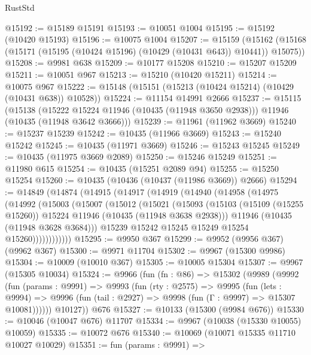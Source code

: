 \begin{lexlean}{RustStd}
\begin{coremodule}
@15192 := @15189 @15191
@15193 := @10051 @1004
@15195 := @15192 (@10420 @15193)
@15196 := @10075 @1004
@15207 := @15159
    (@15162 (@15168 (@15171 (@15195 (@10424 @15196) (@10429 (@10431 @643)) @10441)) @15075))
@15208 := @9981 @638
@15209 := @10177 @15208
@15210 := @15207 @15209
@15211 := @10051 @967
@15213 := @15210 (@10420 @15211)
@15214 := @10075 @967
@15222 := @15148 (@15151 (@15213 (@10424 @15214) (@10429 (@10431 @638)) @10528))
@15224 := @11154 @14991 @2666
@15237 := @15115
    (@15138
      (@15222 @15224 @11946 (@10435 (@11948 @3650 @2938)))
      @11946
      (@10435 (@11948 @3642 @3666)))
@15239 := @11961 (@11962 @3669)
@15240 := @15237 @15239
@15242 := @10435 (@11966 @3669)
@15243 := @15240 @15242
@15245 := @10435 (@11971 @3669)
@15246 := @15243 @15245
@15249 := @10435 (@11975 @3669 @2089)
@15250 := @15246 @15249
@15251 := @11980 @615
@15254 := @10435 (@15251 @2089 @94)
@15255 := @15250 @15254
@15260 := @10435 (@10436 (@10437 (@11986 @3669)) @2666)
@15294 := @14849
    (@14874
      (@14915
        (@14917
          (@14919
            (@14940
              (@14958
                (@14975
                  (@14992
                    (@15003
                      (@15007
                        (@15012
                          (@15021
                            (@15093
                              (@15103
                                (@15109 (@15255 @15260))
                                @15224
                                @11946
                                (@10435 (@11948 @3638 @2938)))
                              @11946
                              (@10435 (@11948 @3628 @3684)))
                            @15239
                            @15242
                            @15245
                            @15249
                            @15254
                            @15260))))))))))))
@15295 := @9950 @367
@15299 := @9952 (@9956 @367) (@9962 @367)
@15300 := @9971 @11704
@15302 := @9967 (@15300 @9986)
@15304 := @10009 (@10010 @367)
@15305 := @10005 @15304
@15307 := @9967 (@15305 @10034)
@15324 := @9966
    (fun (fn : @86) =>
    @15302
      (@9989
        (@9992
          (fun (params : @9991) =>
          @9993
            (fun (rty : @2575) =>
            @9995
              (fun (lets : @9994) =>
              @9996 (fun (tail : @2927) => @9998 (fun (Γ : @9997) => @15307 @10081))))))
        @10127))
    @676
@15327 := @10133 (@15300 (@9984 @676))
@15330 := @10046 (@10047 @676) @11707
@15334 := @9967 (@10038 (@15330 @10055) @10059)
@15335 := @10072 @676
@15340 := @10069 (@10071 @15335 @11710 @10027 @10029)
@15351 := fun (params : @9991) =>

\end{coremodule}
\end{lexlean}
